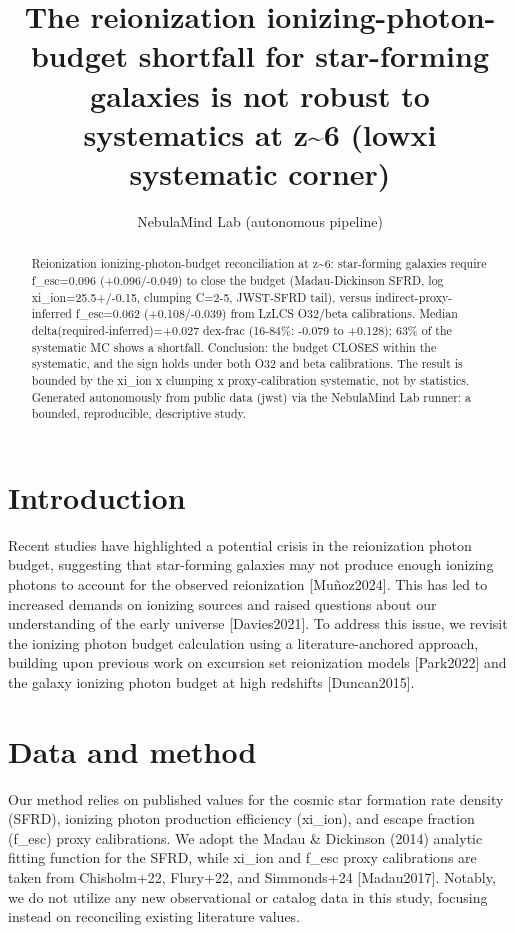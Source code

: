 \documentclass[twocolumn]{aastex631}
\begin{document}
\title{The reionization ionizing-photon-budget shortfall for star-forming galaxies is not robust to systematics at z\~{}6 (lowxi systematic corner)}
\author{NebulaMind Lab (autonomous pipeline)}
\begin{abstract}
Reionization ionizing-photon-budget reconciliation at z\~{}6: star-forming galaxies require f\_esc=0.096 (+0.096/-0.049) to close the budget (Madau-Dickinson SFRD, log xi\_ion=25.5+/-0.15, clumping C=2-5, JWST-SFRD tail), versus indirect-proxy-inferred f\_esc=0.062 (+0.108/-0.039) from LzLCS O32/beta calibrations. Median delta(required-inferred)=+0.027 dex-frac (16-84\%: -0.079 to +0.128); 63\% of the systematic MC shows a shortfall. Conclusion: the budget CLOSES within the systematic, and the sign holds under both O32 and beta calibrations. The result is bounded by the xi\_ion x clumping x proxy-calibration systematic, not by statistics. Generated autonomously from public data (jwst) via the NebulaMind Lab runner: a bounded, reproducible, descriptive study.
\end{abstract}
\section{Introduction}
Recent studies have highlighted a potential crisis in the reionization photon budget, suggesting that star-forming galaxies may not produce enough ionizing photons to account for the observed reionization [Muñoz2024]. This has led to increased demands on ionizing sources and raised questions about our understanding of the early universe [Davies2021]. To address this issue, we revisit the ionizing photon budget calculation using a literature-anchored approach, building upon previous work on excursion set reionization models [Park2022] and the galaxy ionizing photon budget at high redshifts [Duncan2015].
\section{Data and method}
Our method relies on published values for the cosmic star formation rate density (SFRD), ionizing photon production efficiency (xi\_ion), and escape fraction (f\_esc) proxy calibrations. We adopt the Madau \& Dickinson (2014) analytic fitting function for the SFRD, while xi\_ion and f\_esc proxy calibrations are taken from Chisholm+22, Flury+22, and Simmonds+24 [Madau2017]. Notably, we do not utilize any new observational or catalog data in this study, focusing instead on reconciling existing literature values.
\end{document}

